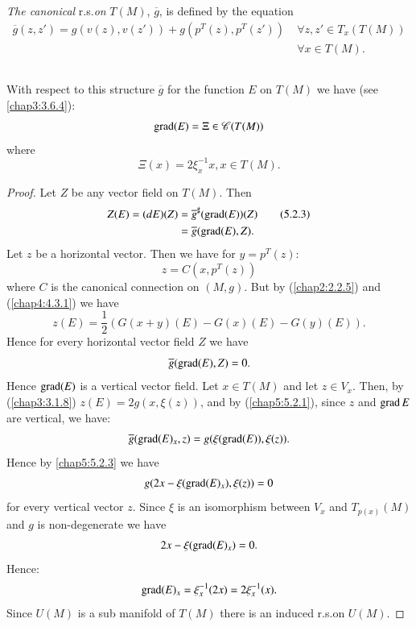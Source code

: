 \begin{defi*}
{\em The canonical} r.s.\@ {\em on} $T(M)$, $\overline{g}$, is defined
by the equation
\begin{align*}
\overline{g}(z,z')=g(v(z),v(z'))+g(p^{T}(z),p^{T}(z')) & \; \forall
z,z'\in T_{x}(T(M))\\
&\;\forall x\in T(M).
\end{align*}
\end{defi*}

\subsection{}\label{chap5:5.2.2}

\begin{lemma*}
With respect to this structure $\overline{g}$ for the function $E$ on
$T(M)$ we have (see \ref{chap3:3.6.4}):
$$
\operatorname{grad} (E)=\Xi \in\mathscr{C}(T(M))
$$
where
$$
\Xi(x)=2\xi^{-1}_{x}x, x\in T(M).
$$
\end{lemma*}

\begin{proof}
Let \pageoriginale $Z$ be any vector field on $T(M)$. Then
\begin{align*}
Z(E)=(dE)(Z) &= \overline{g}^{\sharp}(\operatorname{grad} (E))(Z)\tag{5.2.3}\label{chap5:5.2.3}\\
             &= \overline{g}(\operatorname{grad} (E),Z).
\end{align*}
Let $z$ be a horizontal vector. Then we have for $y=p^{T}(z)$:
$$
z=C(x,p^{T}(z))
$$
where $C$ is the canonical connection on $(M,g)$. But by (\eqref{chap2:2.2.5})
and (\ref{chap4:4.3.1}) we have
$$
z(E)=\frac{1}{2}(G(x+y)(E)-G(x)(E)-G(y)(E)).
$$
Hence for every horizontal vector field $Z$ we have
$$
\overline{g}(\operatorname{grad} (E), Z)=0.
$$
Hence $\operatorname{grad} (E)$ is a vertical vector field. Let $x\in T(M)$ and let
$z\in V_{x}$. Then, by (\ref{chap3:3.1.8}) $z(E)=2g(x,\xi(z))$, and by
(\ref{chap5:5.2.1}), since $z$ and $\operatorname{grad} E$ are vertical, we have:
$$
\overline{g}(\operatorname{grad}(E)_{x},z)=g(\xi(\operatorname{grad}(E)),\xi(z)).
$$
Hence by \eqref{chap5:5.2.3} we have
$$
g(2x-\xi(\operatorname{grad}(E)_{x}),\xi(z))=0
$$
for every vertical vector $z$. Since $\xi$ is an isomorphism between
$V_{x}$ and $T_{p(x)}(M)$ and $g$ is non-degenerate we have
$$
2x-\xi(\operatorname{grad}(E)_{x})=0.
$$
Hence:
$$
\operatorname{grad}(E)_{x}=\xi^{-1}_{x}(2x)=2\xi^{-1}_{x}(x).
$$
Since \pageoriginale $U(M)$ is a sub manifold of $T(M)$ there is an
induced r.s.\@ on $U(M)$.
\end{proof}

\setcounter{subsection}{3}

